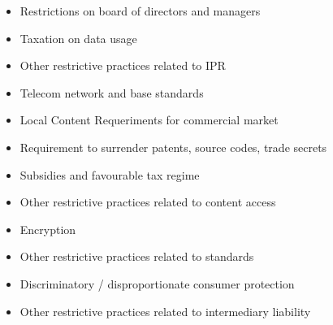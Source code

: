 \documentclass[11pt]{article}
\begin{document}
\begin{itemize}
\item Restrictions on board of directors and managers
\item Taxation on data usage
\item Other restrictive practices related to IPR
\item Telecom network and base standards
\item Local Content Requeriments for commercial market
\item Requirement to surrender patents, source codes, trade secrets
\item Subsidies and favourable tax regime
\item Other restrictive practices related to content access
\item Encryption
\item Other restrictive practices related to standards
\item Discriminatory / disproportionate consumer protection
\item Other restrictive practices related to intermediary liability
\end{itemize}
\end{document}
